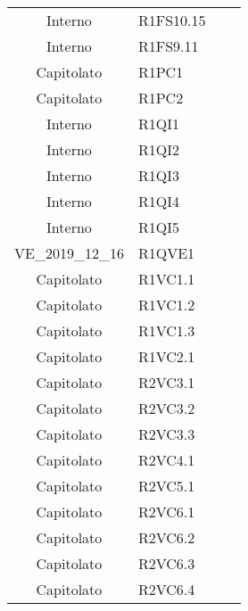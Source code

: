 {\begin{longtable}{ c C{4cm} c c}
Interno & R1FS10.15\\

Interno & R1FS9.11\\


Capitolato & R1PC1\\

Capitolato & R1PC2\\


Interno & R1QI1\\

Interno & R1QI2\\

Interno & R1QI3\\

Interno & R1QI4\\

Interno & R1QI5\\

VE\_2019\_12\_16 & R1QVE1\\


Capitolato & R1VC1.1\\

Capitolato & R1VC1.2\\

Capitolato & R1VC1.3\\

Capitolato & R1VC2.1\\

Capitolato & R2VC3.1\\

Capitolato & R2VC3.2\\

Capitolato & R2VC3.3\\

Capitolato & R2VC4.1\\

Capitolato & R2VC5.1\\


Capitolato & R2VC6.1\\

Capitolato & R2VC6.2\\

Capitolato & R2VC6.3\\

Capitolato & R2VC6.4\\


\end{longtable}}
